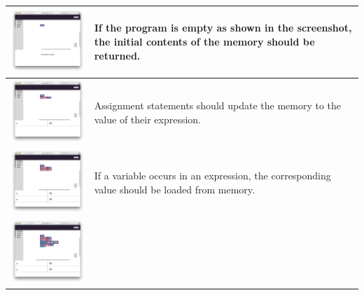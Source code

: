\documentclass{cs256-shared/cs256}
\begin{document}
\begin{center}
	\begin{longtable}[t]{|c|p{5cm}|}
		\hline 
		\includegraphics[align=t,width=250px]{semantics/0-empty.png} & 
		If the program is empty as shown in the screenshot, the initial contents of the memory should be returned. \\ \hline 
		\includegraphics[align=t,width=250px]{semantics/1-assignment.png} & 
		Assignment statements should update the memory to the value of their expression. \\ \hline 
		\includegraphics[align=t,width=250px]{semantics/2-loading.png} &
		If a variable occurs in an expression, the corresponding value should be loaded from memory. \\ \hline 
		\includegraphics[align=t,width=250px]{semantics/3-if.png} &

\end{longtable}
\end{center}
\end{document}
